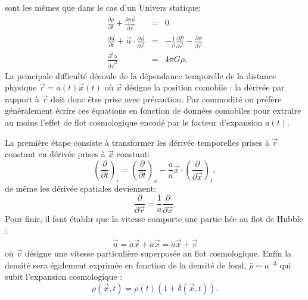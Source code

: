  sont les mêmes que dans le cas d'un Univers statique:
\begin{eqnarray}
\frac{\partial \rho}{\partial t}+\frac{\partial \rho \vec u}{\partial \vec r}&=&0\\
\frac{\partial \vec u}{\partial t}+\vec u \cdot \frac{\partial \vec u}{\partial \vec r}&=&-\frac{1}{\rho}\frac{\partial P}{\partial \vec r}-\frac{\partial \phi}{\partial \vec r}\\
\frac{\partial^2 \phi}{\partial \vec r^2}&=&4\pi G \rho.
\end{eqnarray}
 La principale difficulté découle de la dépendance temporelle de la distance physique $\vec r=a(t) \vec x(t)$ où $\vec x$ désigne la position comobile : la dérivée par rapport à $\vec r$ doit donc être prise avec précaution. Par commodité on préfère généralement écrire ces équations en fonction de données comobiles pour extraire au moins l'effet de flot cosmologique encodé par le facteur d'expansion $a(t)$.
 
La première étape consiste à transformer les dérivée temporelles prises à $\vec r$ constant en dérivée prises à $\vec x$ constant:
\begin{equation}
\left(\frac{\partial }{\partial t}\right)_r = \left(\frac{\partial }{\partial t}\right)_x-\frac{\dot a}{a}\vec x \cdot \left(\frac{\partial}{\partial \vec x}\right)_t,
\end{equation}
de même les dérivée spatiales deviennent:
\begin{equation}
\frac{\partial }{\partial \vec r}=\frac{1}{a}\frac{\partial}{\partial \vec x}.
\end{equation}
 Pour finir, il faut établir que la vitesse comporte une partie liée au flot de Hubble :
\begin{equation}
\dot {\vec u}=\dot a \vec x + a \dot {\vec x}= \dot a \vec x + \vec v
\end{equation}
 où $\vec v$ désigne une vitesse particulière superposée au flot cosmologique.
 Enfin la densité sera également exprimée en fonction de la densité de fond, $\bar \rho \sim a^{-3}$ qui subit l'expansion cosmologique :
 \begin{equation}
 \rho(\vec x,t) =\bar \rho(t)(1+\delta(\vec x,t)).
 \end{equation}
 
